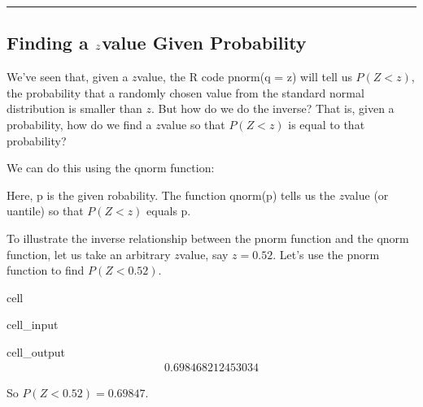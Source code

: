 \documentclass[letterpaper,10pt,english]{jupyterBook}
\begin{document}
\bigskip\hrule\bigskip



\subsection{Finding a \protect\(z\protect\)\sphinxhyphen{}value Given Probability}
\label{\detokenize{Ch4 The Normal Distribution and the Central Limit Theorem/4.2 The Standard Normal Distribution:finding-a-z-value-given-probability}}
\sphinxAtStartPar
We’ve seen that, given a \(z\)\sphinxhyphen{}value, the R code pnorm(q = z) will tell us \(P(Z < z)\), the probability that a randomly chosen value from the standard normal distribution is smaller than \(z\). But how do we do the inverse? That is, given a probability, how do we find a \(z\)\sphinxhyphen{}value so that \(P(Z < z)\) is equal to that probability?

\sphinxAtStartPar
We can do this using the qnorm function:

\begin{sphinxVerbatim}[commandchars=\\\{\}]
\end{sphinxVerbatim}

\sphinxAtStartPar
Here, p is the given robability. The function qnorm(p) tells us the \(z\)\sphinxhyphen{}value (or uantile) so that \(P(Z < z)\) equals p.

\sphinxAtStartPar
To illustrate the inverse relationship between the pnorm function and the qnorm function, let us take an arbitrary \(z\)\sphinxhyphen{}value, say \(z = 0.52\). Let’s use the pnorm function to find \(P(Z < 0.52)\).

\begin{sphinxuseclass}{cell}\begin{sphinxVerbatimInput}

\begin{sphinxuseclass}{cell_input}
\begin{sphinxVerbatim}[commandchars=\\\{\}]
\end{sphinxVerbatim}

\end{sphinxuseclass}\end{sphinxVerbatimInput}
\begin{sphinxVerbatimOutput}

\begin{sphinxuseclass}{cell_output}\begin{equation*}
\begin{split}0.698468212453034\end{split}
\end{equation*}
\end{sphinxuseclass}\end{sphinxVerbatimOutput}

\end{sphinxuseclass}
\sphinxAtStartPar
So \(P(Z < 0.52) = 0.69847\).
\end{document}
